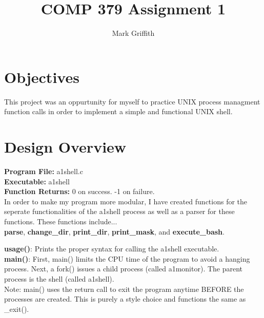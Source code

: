 \documentclass{article}
\begin{document}
\title{COMP 379 Assignment 1}
\author{Mark Griffith}

\maketitle

\section{Objectives}
This project was an oppurtunity for myself to practice UNIX process managment function calls
in order to implement a simple and functional UNIX shell.


\section{Design Overview}
\textbf{Program File:} a1shell.c \\
\textbf{Executable:} a1shell \\
\textbf{Function Returns:} 0 on success. -1 on failure. \\

\noindent
In order to make my program more modular, I have created functions
for the seperate functionalities of the a1shell process as well as
a parser for these functions. These functions include... \\
\textbf{parse}, \textbf{change_dir}, \textbf{print_dir}, \textbf{print_mask}, 
and \textbf{execute_bash}.

\noindent
\textbf{usage()}: Prints the proper syntax for calling the a1shell executable. \\

\noindent
\textbf{main()}: First, main() limits the CPU time of the program to avoid a hanging
process.
Next, a fork() issues a child process (called a1monitor). The parent process is the
shell (called a1shell). \\
\noindent
Note: main() uses the return call to exit the program anytime BEFORE the processes
are created. This is purely a style choice and functions the same as \_exit(). \\
\end{document}
